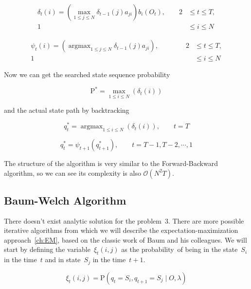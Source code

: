 \documentclass[thesis=M,english]{FITthesis}[2012/10/20]
\newcommand{\argmax}{\mathop{\mathrm{argmax}}}
\begin{document}
\begin{equation}
\begin{aligned}
\delta_{t}(i) = ( \max_{ 1 \leq j \leq N } \delta_{t-1}(j)a_{ji} ) b_i(O_{t}), \qquad 2& \leq t \leq T, \\
																					   1& \leq i \leq N
\end{aligned}
\end{equation}

\begin{equation}
\begin{aligned}
\psi_{t}(i) = ( \argmax_{ 1 \leq j \leq N } \delta_{t-1}(j)a_{ji} ), \qquad \qquad 2& \leq t \leq T, \\
																			1& \leq i \leq N
\end{aligned}
\end{equation}

Now we can get the searched state sequence probability 

\begin{equation}
\mathrm{P}^* = \max_{1 \leq i \leq N} ( \delta_{t}(i) )  
\end{equation}

and the actual state path by backtracking

\begin{equation}
q_t^* = \argmax_{1 \leq i \leq N} ( \delta_{t}(i) ),  \qquad t = T  
\end{equation}

\begin{equation}
q_t^* = \psi_{t+1}(q_{t+1}^*), \qquad t = T-1, T-2, \cdots, 1  
\end{equation}

The structure of the algorithm is very similar to the Forward-Backward algorithm, so we can see its complexity is also $\mathcal{O}(N^2T)$.


\subsection{Baum-Welch Algorithm}

There doesn't exist analytic solution for the problem~3. There are more possible iterative algorithms from which we will describe the expectation-maximization approach~\ref{ch:EM}, based on the classic work of Baum and his colleagues. We will start by defining the variable~$\xi_t(i,j)$ as the probability~of being in the state~$S_i$ in the time~$t$ and in state~$S_j$ in the time~$t+1$. 

\begin{equation}
\xi_t(i,j) = \mathrm{P}( q_t = S_i, q_{t+1} = S_j \mid O, \lambda )  
\end{equation}
\end{document}
